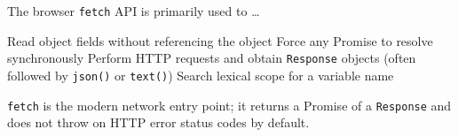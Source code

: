 \question[4]
The browser \texttt{fetch} API is primarily used to \ldots
\begin{choices}
  \choice Read object fields without referencing the object
  \choice Force any Promise to resolve synchronously
  \CorrectChoice Perform HTTP requests and obtain \texttt{Response} objects (often followed by \texttt{json()} or \texttt{text()})
  \choice Search lexical scope for a variable name
\end{choices}
\begin{solution}
  \texttt{fetch} is the modern network entry point; it returns a Promise of a \texttt{Response} and does not throw on HTTP error status codes by default.
\end{solution}

